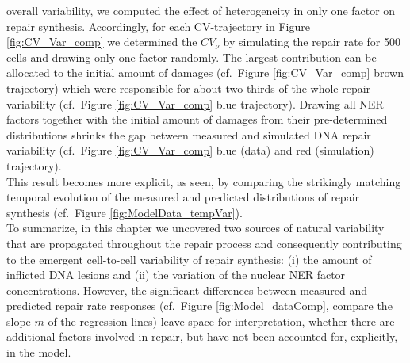 overall variability, we computed the effect of heterogeneity in only one factor on repair synthesis. Accordingly, for each CV-trajectory in Figure \ref{fig:CV_Var_comp} we determined the $CV_{\nu}$ by simulating the repair rate for 500 cells and drawing only one factor randomly. The largest contribution can be allocated to the initial amount of damages (cf.\ Figure \ref{fig:CV_Var_comp} brown trajectory) which were responsible for about two thirds of the whole repair variability (cf.\ Figure \ref{fig:CV_Var_comp} blue trajectory). Drawing all NER factors together with the initial amount of damages from their pre-determined distributions shrinks the gap between measured and simulated DNA repair variability (cf.\ Figure \ref{fig:CV_Var_comp} blue (data) and red (simulation) trajectory).\\
This result becomes more explicit, as seen, by comparing the strikingly matching temporal evolution of the measured and predicted distributions of repair synthesis (cf.\ Figure \ref{fig:ModelData_tempVar}).\\




To summarize, in this chapter we uncovered two sources of natural variability that are propagated throughout the repair process and consequently contributing to the emergent cell-to-cell variability of repair synthesis: (i) the amount of inflicted DNA lesions and (ii) the variation of the nuclear NER factor concentrations. 
However, the significant differences between measured and predicted repair rate responses (cf.\ Figure \ref{fig:Model_dataComp}, compare the slope $m$ of the regression lines) leave space for interpretation, whether there are additional factors involved in repair, but have not been accounted for, explicitly, in the model.

